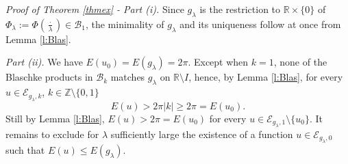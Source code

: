 \documentclass[12pt, a4paper]{article}
\newcommand{\M}[1]{\mathcal{#1}}
\newcommand{\R}{\mathbb{R}}
\renewcommand{\(}{\left(}
\renewcommand{\)}{\right)}
\begin{document}
\noindent\emph{Proof of Theorem \ref{thmex} - Part (i).} Since $g_\lambda$ is the restriction to $\R\times\{0\}$ of $\Phi_\lambda:=\Phi\(\tfrac{\cdot}{\lambda}\)\in\M{B}_1$, the minimality of $g_\lambda$ and its uniqueness follow at once from Lemma \ref{l:Blas}.


\medskip
\noindent\emph{Part (ii).}
We have $E(u_0)=E(g_\lambda)=2\pi$.  Except when $k=1$, none of the Blaschke products in $\M{B}_k$ matches $g_\lambda$ on $\R\setminus I$, hence, by Lemma \ref{l:Blas}, for every $u\in \M{E}_{g_\lambda,k}$, $k\in \mathbb{Z}\setminus \{0,1\}$
$$E(u)>2\pi|k|\ge 2\pi = E(u_0).$$
Still by Lemma \ref{l:Blas}, $E(u)>2\pi =E(u_0)$ for every $u\in \M{E}_{g_\lambda,1}\setminus\{u_0\}$.
It remains to exclude for $\lambda$ sufficiently large the existence of a function $u\in \M{E}_{g_\lambda,0}$ such that $E(u)\le E(g_\lambda)$.
\end{document}

